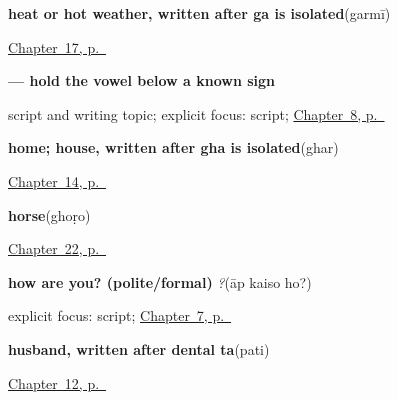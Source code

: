 \noindent\begin{minipage}[t]{\linewidth}
\raggedright
\textbf{heat or hot weather, written after ga is isolated}\enspace\emph{}\enspace(garmī)\par
\footnotesize \hyperref[ch:mw-weather-six]{Chapter~17, p.~\pageref*{ch:mw-weather-six}}
\end{minipage}\par\smallskip

\noindent\begin{minipage}[t]{\linewidth}
\raggedright
\textbf{ — hold the vowel below a known sign}\par
\footnotesize script and writing topic; explicit focus: script; \hyperref[ch:mw-wellbeing-answer]{Chapter~8, p.~\pageref*{ch:mw-wellbeing-answer}}
\end{minipage}\par\smallskip

\noindent\begin{minipage}[t]{\linewidth}
\raggedright
\textbf{home; house, written after gha is isolated}\enspace\emph{}\enspace(ghar)\par
\footnotesize \hyperref[ch:mw-places-three]{Chapter~14, p.~\pageref*{ch:mw-places-three}}
\end{minipage}\par\smallskip

\noindent\begin{minipage}[t]{\linewidth}
\raggedright
\textbf{horse}\enspace\emph{}\enspace(ghoṛo)\par
\footnotesize \hyperref[ch:mw-transport-five]{Chapter~22, p.~\pageref*{ch:mw-transport-five}}
\end{minipage}\par\smallskip

\noindent\begin{minipage}[t]{\linewidth}
\raggedright
\textbf{how are you? (polite/formal)}\enspace\emph{  ?}\enspace(āp kaiso ho?)\par
\footnotesize explicit focus: script; \hyperref[ch:mw-wellbeing-question]{Chapter~7, p.~\pageref*{ch:mw-wellbeing-question}}
\end{minipage}\par\smallskip

\noindent\begin{minipage}[t]{\linewidth}
\raggedright
\textbf{husband, written after dental ta}\enspace\emph{}\enspace(pati)\par
\footnotesize \hyperref[ch:mw-family-ten]{Chapter~12, p.~\pageref*{ch:mw-family-ten}}
\end{minipage}\par\smallskip

